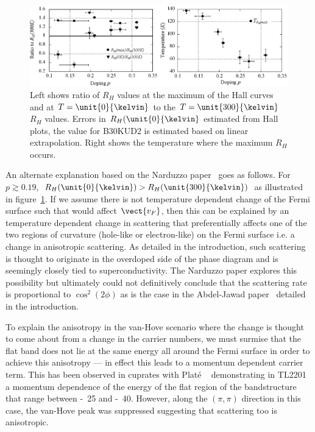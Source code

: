 \begin{figure}[htbp]
    \begin{center}
        \includegraphics[scale=0.8]{Chapter-HallBSCO/Figures/RhRatios/RhRatios}
        \caption{Left shows ratio of $R_H$ values at the maximum of the Hall curves and at $T=\unit{0}{\kelvin}$ to the $T=\unit{300}{\kelvin}$ $R_H$ values. Errors in $R_H(\unit{0}{\kelvin}$ estimated from Hall plots, the value for B30KUD2 is estimated based on linear extrapolation. Right shows the temperature where the maximum $R_H$ occurs.}
        \label{Fig:ResH:RhRatios}
    \end{center}
\end{figure}

An alternate explanation based on the Narduzzo paper~\cite{Narduzzo2008} goes as follows. For $p \gtrsim 0.19$, $R_H(\unit{0}{\kelvin}) > R_H(\unit{300}{\kelvin})$ as illustrated in figure~\ref{Fig:ResH:RhRatios}. If we assume there is not temperature dependent change of the Fermi surface such that would affect $\vect{v_F}$, then this can be explained by an temperature dependent change in scattering that preferentially affects one of the two regions of curvature (hole-like or electron-like) on the Fermi surface i.e. a change in anisotropic scattering. As detailed in the introduction, such scattering is thought to originate in the overdoped side of the phase diagram and is seemingly closely tied to superconductivity. The Narduzzo paper explores this possibility but ultimately could not definitively conclude that the scattering rate is proportional to $\cos^2(2\phi)$ as is the case in the Abdel-Jawad paper~\cite{Abdel-Jawad2007} detailed in the introduction.

To explain the anisotropy in the van-Hove scenario where the change is thought to come about from a change in the carrier numbers, we must surmise that the flat band does not lie at the same energy all around the Fermi surface in order to achieve this anisotropy --- in effect this leads to a momentum dependent carrier term. This has been observed in cuprates with Plat\'e \etal~\cite{Plate2005} demonstrating in \ac{TL2201} a momentum dependence of the energy of the flat region of the bandstructure that range between \unit{-25}{\milli\electronvolt} and \unit{-40}{\milli\electronvolt}. However, along the $(\pi, \pi)$ direction in this case, the van-Hove peak was suppressed suggesting that scattering too is anisotropic.

